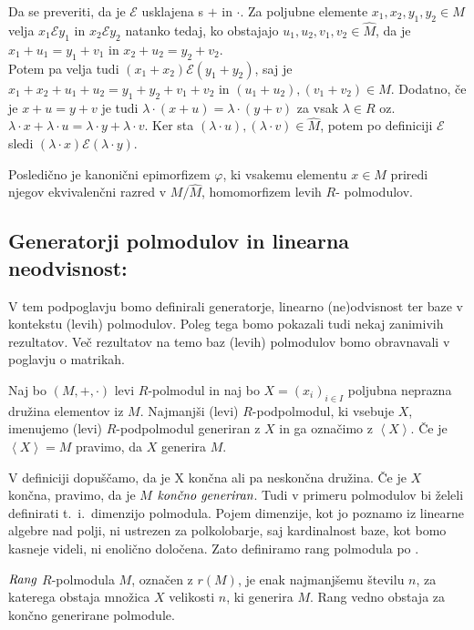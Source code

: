 \documentclass[mat1]{fmfdelo}
\newcommand{\pojem}[1]{\ensuremath{\emph{#1}}}
\newcommand{\Gen}[1]{\ensuremath{\left<{#1}\right>}}
\begin{document}
Da se preveriti, da je $\mathcal{E}$ usklajena s $+$ in $\cdot$. Za poljubne elemente $x_1, x_2, y_1, y_2 \in M$ velja $x_1\mathcal{E}y_1$ in $x_2\mathcal{E}y_2$ natanko tedaj, ko obstajajo $u_1, u_2, v_1, v_2 \in \widehat{M}$, da je $x_1 + u_1 = y_1 + v_1$ in $ x_2 + u_2 = y_2 + v_2$. \\

Potem pa velja tudi $(x_1 + x_2)\mathcal{E}(y_1 + y_2)$, saj je $x_1 + x_2 + u_1 + u_2 = y_1 + y_2 + v_1 + v_2$ in $(u_1 + u_2), (v_1 + v_2)\in \widehat{M}$. Dodatno, če je $x + u = y + v$ je tudi $\lambda\cdot (x + u) = \lambda\cdot (y + v)$ za vsak $\lambda\in R$ oz. $\lambda\cdot x + \lambda\cdot u = \lambda\cdot y + \lambda\cdot v$. Ker sta $(\lambda\cdot u), (\lambda\cdot v)\in \widehat{M}$, potem po definiciji $\mathcal{E}$ sledi $(\lambda\cdot x) \mathcal{E} (\lambda\cdot y)$.

Posledično je kanonični epimorfizem $\varphi$, ki vsakemu elementu $x\in M$ priredi njegov ekvivalenčni razred v $M/\widehat{M}$, homomorfizem levih $R$- polmodulov.

\subsection{Generatorji polmodulov in linearna neodvisnost:}
V tem podpoglavju bomo definirali generatorje, linearno (ne)odvisnost ter baze v kontekstu (levih) polmodulov. Poleg tega bomo pokazali tudi nekaj zanimivih rezultatov. Več rezultatov na temo baz (levih) polmodulov bomo obravnavali v poglavju o matrikah.
\begin{definicija}
	Naj bo $(M, +, \cdot)$ levi $R$-polmodul in naj bo $X = (x_i)_{i\in I}$ poljubna neprazna družina elementov iz $M$. Najmanjši (levi) $R$-podpolmodul, ki vsebuje $X$, imenujemo (levi) $R$-podpolmodul generiran z $X$ in ga označimo z \Gen{X}. Če je $\Gen{X} = M$ pravimo, da $X$ generira $M$.
\end{definicija}

	V definiciji dopuščamo, da je X končna ali pa neskončna družina. Če je $X$ končna, pravimo, da je $M$ \pojem{končno generiran}. Tudi v primeru polmodulov bi želeli definirati t.~i.\ dimenzijo polmodula. Pojem dimenzije, kot jo poznamo iz linearne algebre nad polji, ni ustrezen za polkolobarje, saj kardinalnost baze, kot bomo kasneje videli, ni enolično določena. Zato definiramo rang polmodula po \cite[str. 3--4]{bib:Tanbase}.

\begin{definicija}
	\pojem{Rang} $R$-polmodula $M$, označen z $r(M)$, je enak najmanjšemu številu $n$, za katerega obstaja množica $X$ velikosti $n$, ki generira $M$. Rang vedno obstaja za končno generirane polmodule. 
\end{definicija}
\end{document}
